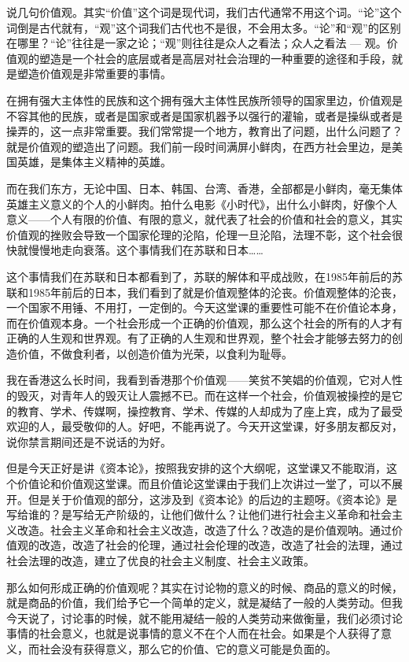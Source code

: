 \documentclass[UTF8, 12pt, a4paper]{ctexrep}
\begin{document}
说几句价值观。其实“价值”这个词是现代词，我们古代通常不用这个词。“论”这个词倒是古代就有，“观”这个词我们古代也不是很，不会用太多。“论”和“观”的区别在哪里？“论”往往是一家之论；“观”则往往是众人之看法；众人之看法 — 观。价值观的塑造是一个社会的底层或者是高层对社会治理的一种重要的途径和手段，就是塑造价值观是非常重要的事情。

在拥有强大主体性的民族和这个拥有强大主体性民族所领导的国家里边，价值观是不容其他的民族，或者是国家或者是国家机器予以强行的灌输，或者是操纵或者是操弄的，这一点非常重要。我们常常提一个地方，教育出了问题，出什么问题了？就是价值观的塑造出了问题。我们前一段时间满屏小鲜肉，在西方社会里边，是美国英雄，是集体主义精神的英雄。

而在我们东方，无论中国、日本、韩国、台湾、香港，全部都是小鲜肉，毫无集体英雄主义意义的个人的小鲜肉。拍什么电影《小时代》，出什么小鲜肉，好像个人意义——个人有限的价值、有限的意义，就代表了社会的价值和社会的意义，其实价值观的挫败会导致一个国家伦理的沦陷，伦理一旦沦陷，法理不彰，这个社会很快就慢慢地走向衰落。这个事情我们在苏联和日本……

这个事情我们在苏联和日本都看到了，苏联的解体和平成战败，在1985年前后的苏联和1985年前后的日本，我们看到了就是价值观整体的沦丧。价值观整体的沦丧，一个国家不用锤、不用打，一定倒的。今天这堂课的重要性可能不在价值论本身，而在价值观本身。一个社会形成一个正确的价值观，那么这个社会的所有的人才有正确的人生观和世界观。有了正确的人生观和世界观，整个社会才能够去努力的创造价值，不做食利者，以创造价值为光荣，以食利为耻辱。

我在香港这么长时间，我看到香港那个价值观——笑贫不笑娼的价值观，它对人性的毁灭，对青年人的毁灭让人震撼不已。而在这样一个社会，价值观被操控的是它的教育、学术、传媒啊，操控教育、学术、传媒的人却成为了座上宾，成为了最受欢迎的人，最受敬仰的人。好吧，不能再说了。今天开这堂课，好多朋友都反对，说你禁言期间还是不说话的为好。

但是今天正好是讲《资本论》，按照我安排的这个大纲呢，这堂课又不能取消，这个价值论和价值观这堂课。而且价值论这堂课由于我们上次讲过一堂了，可以不展开。但是关于价值观的部分，这涉及到《资本论》的后边的主题呀。《资本论》是写给谁的？是写给无产阶级的，让他们做什么？让他们进行社会主义革命和社会主义改造。社会主义革命和社会主义改造，改造了什么？改造的是价值观呐。通过价值观的改造，改造了社会的伦理，通过社会伦理的改造，改造了社会的法理，通过社会法理的改造，建立了优良的社会主义制度、社会主义政策。

那么如何形成正确的价值观呢？其实在讨论物的意义的时候、商品的意义的时候，就是商品的价值，我们给予它一个简单的定义，就是凝结了一般的人类劳动。但我今天说了，讨论事的时候，就不能用凝结一般的人类劳动来做衡量，我们必须讨论事情的社会意义，也就是说事情的意义不在个人而在社会。如果是个人获得了意义，而社会没有获得意义，那么它的价值、它的意义可能是负面的。
\end{document}
